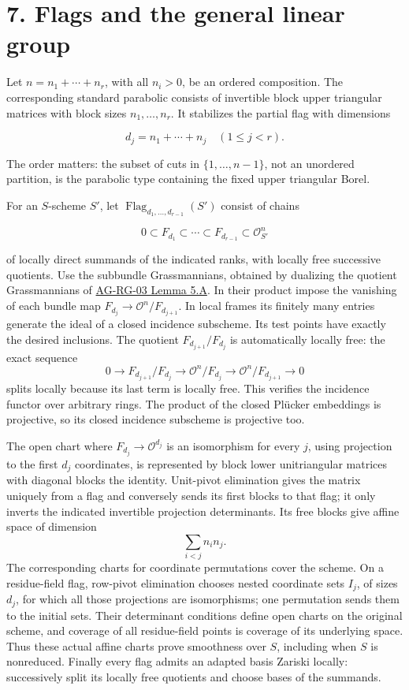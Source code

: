 \documentclass[11pt,a4paper,openany]{report}
\begin{document}
\section{7. Flags and the general linear group}\label{AG-RG-06-flags-and-the-general-linear-group}

Let \(n=n_1+\cdots+n_r\), with all \(n_i>0\), be an ordered composition. The corresponding standard parabolic consists of invertible block upper triangular matrices with block sizes \(n_1,\ldots,n_r\). It stabilizes the partial flag with dimensions

\[
d_j=n_1+\cdots+n_j\quad(1\leq j<r).
\]

The order matters: the subset of cuts in \(\{1,\ldots,n-1\}\), not an unordered partition, is the parabolic type containing the fixed upper triangular Borel.

For an \(S\)-scheme \(S'\), let \(\operatorname{Flag}_{d_1,\ldots,d_{r-1}}(S')\) consist of chains

\[
0\subset F_{d_1}\subset\cdots\subset F_{d_{r-1}}\subset\mathcal O_{S'}^n
\]

of locally direct summands of the indicated ranks, with locally free successive quotients. Use the subbundle Grassmannians, obtained by dualizing the quotient Grassmannians of \href{https://github.com/KokunoYumeto/open-math-courses/blob/main/docs/courses/AG-RG/AG-RG-03.md\#ag-rg-03-grassmannian}{AG-RG-03 Lemma 5.A}. In their product impose the vanishing of each bundle map \(F_{d_j}\to\mathcal O^n/F_{d_{j+1}}\). In local frames its finitely many entries generate the ideal of a closed incidence subscheme. Its test points have exactly the desired inclusions. The quotient \(F_{d_{j+1}}/F_{d_j}\) is automatically locally free: the exact sequence \[
0\to F_{d_{j+1}}/F_{d_j}\to
\mathcal O^n/F_{d_j}\to\mathcal O^n/F_{d_{j+1}}\to0
\] splits locally because its last term is locally free. This verifies the incidence functor over arbitrary rings. The product of the closed Plücker embeddings is projective, so its closed incidence subscheme is projective too.

The open chart where \(F_{d_j}\to\mathcal O^{d_j}\) is an isomorphism for every \(j\), using projection to the first \(d_j\) coordinates, is represented by block lower unitriangular matrices with diagonal blocks the identity. Unit-pivot elimination gives the matrix uniquely from a flag and conversely sends its first blocks to that flag; it only inverts the indicated invertible projection determinants. Its free blocks give affine space of dimension \[
\sum_{i<j}n_in_j.\tag{7.1}
\] The corresponding charts for coordinate permutations cover the scheme. On a residue-field flag, row-pivot elimination chooses nested coordinate sets \(I_j\), of sizes \(d_j\), for which all those projections are isomorphisms; one permutation sends them to the initial sets. Their determinant conditions define open charts on the original scheme, and coverage of all residue-field points is coverage of its underlying space. Thus these actual affine charts prove smoothness over \(S\), including when \(S\) is nonreduced. Finally every flag admits an adapted basis Zariski locally: successively split its locally free quotients and choose bases of the summands.
\end{document}
